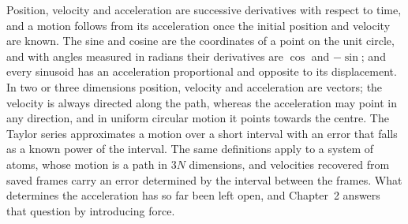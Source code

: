 
Position, velocity and acceleration are successive derivatives with
respect to time, and a motion follows from its acceleration once the
initial position and velocity are known. The sine and cosine are the
coordinates of a point on the unit circle, and with angles measured in
radians their derivatives are $\cos$ and $-\sin$; and every sinusoid has an acceleration
proportional and opposite to its displacement. In two or three dimensions
position, velocity and acceleration are vectors; the velocity is always
directed along the path, whereas the acceleration may point in any
direction, and in uniform circular motion it points towards the centre.
The Taylor series approximates a motion over a short interval with an
error that falls as a known power of the interval. The same definitions
apply to a system of atoms, whose motion is a path in $3N$ dimensions,
and velocities recovered from saved frames carry an error determined by
the interval between the frames. What determines the acceleration has so
far been left open, and Chapter~2 answers that question by introducing
force.
